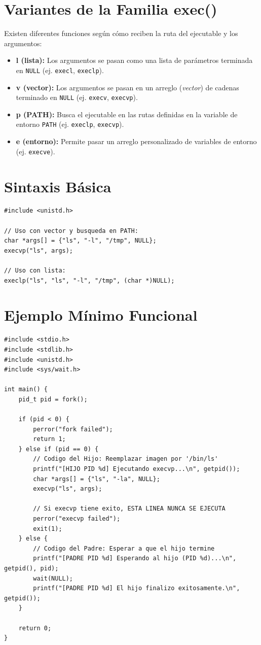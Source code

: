 \documentclass[12pt,a4paper]{article}
\begin{document}
\section{Variantes de la Familia exec()}
Existen diferentes funciones según cómo reciben la ruta del ejecutable y los argumentos:
\begin{itemize}
    \item \textbf{l (lista):} Los argumentos se pasan como una lista de parámetros terminada en \texttt{NULL} (ej. \texttt{execl}, \texttt{execlp}).
    \item \textbf{v (vector):} Los argumentos se pasan en un arreglo (\textit{vector}) de cadenas terminado en \texttt{NULL} (ej. \texttt{execv}, \texttt{execvp}).
    \item \textbf{p (PATH):} Busca el ejecutable en las rutas definidas en la variable de entorno \texttt{PATH} (ej. \texttt{execlp}, \texttt{execvp}).
    \item \textbf{e (entorno):} Permite pasar un arreglo personalizado de variables de entorno (ej. \texttt{execve}).
\end{itemize}

\section{Sintaxis Básica}
\begin{lstlisting}[numbers=none]
#include <unistd.h>

// Uso con vector y busqueda en PATH:
char *args[] = {"ls", "-l", "/tmp", NULL};
execvp("ls", args);

// Uso con lista:
execlp("ls", "ls", "-l", "/tmp", (char *)NULL);
\end{lstlisting}

\section{Ejemplo Mínimo Funcional}
\begin{lstlisting}
#include <stdio.h>
#include <stdlib.h>
#include <unistd.h>
#include <sys/wait.h>

int main() {
    pid_t pid = fork();

    if (pid < 0) {
        perror("fork failed");
        return 1;
    } else if (pid == 0) {
        // Codigo del Hijo: Reemplazar imagen por '/bin/ls'
        printf("[HIJO PID %d] Ejecutando execvp...\n", getpid());
        char *args[] = {"ls", "-la", NULL};
        execvp("ls", args);

        // Si execvp tiene exito, ESTA LINEA NUNCA SE EJECUTA
        perror("execvp failed");
        exit(1);
    } else {
        // Codigo del Padre: Esperar a que el hijo termine
        printf("[PADRE PID %d] Esperando al hijo (PID %d)...\n", getpid(), pid);
        wait(NULL);
        printf("[PADRE PID %d] El hijo finalizo exitosamente.\n", getpid());
    }

    return 0;
}
\end{lstlisting}
\end{document}
